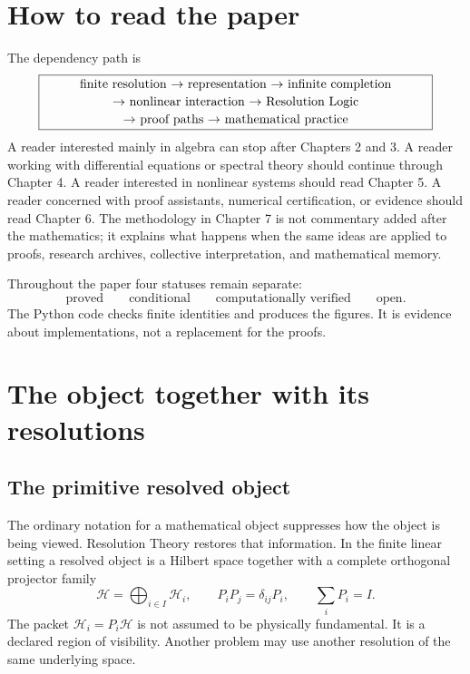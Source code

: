 \documentclass[11pt,oneside]{book}
\theoremstyle{remark}
\begin{document}
\chapter*{How to read the paper}
The dependency path is
\[
\boxed{\begin{minipage}{0.88\linewidth}
\centering
finite resolution $\to$ representation $\to$ infinite completion\\[2pt]
$\to$ nonlinear interaction $\to$ Resolution Logic\\[2pt]
$\to$ proof paths $\to$ mathematical practice
\end{minipage}}
\]
A reader interested mainly in algebra can stop after Chapters 2 and 3.  A reader working with differential equations or spectral theory should continue through Chapter 4.  A reader interested in nonlinear systems should read Chapter 5.  A reader concerned with proof assistants, numerical certification, or evidence should read Chapter 6.  The methodology in Chapter 7 is not commentary added after the mathematics; it explains what happens when the same ideas are applied to proofs, research archives, collective interpretation, and mathematical memory.

Throughout the paper four statuses remain separate:
\[
\boxed{
\text{proved}
\qquad
\text{conditional}
\qquad
\text{computationally verified}
\qquad
\text{open}.
}
\]
The Python code checks finite identities and produces the figures.  It is evidence about implementations, not a replacement for the proofs.

\tableofcontents
\mainmatter

\chapter{The object together with its resolutions}

\section{The primitive resolved object}
The ordinary notation for a mathematical object suppresses how the object is being viewed.  Resolution Theory restores that information.  In the finite linear setting a resolved object is a Hilbert space together with a complete orthogonal projector family
\[
\mathcal H=\bigoplus_{i\in I}\mathcal H_i,
\qquad
P_iP_j=\delta_{ij}P_i,
\qquad
\sum_iP_i=I.
\]
The packet \(\mathcal H_i=P_i\mathcal H\) is not assumed to be physically fundamental.  It is a declared region of visibility.  Another problem may use another resolution of the same underlying space.
\end{document}
